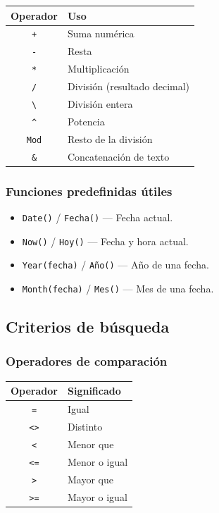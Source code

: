 \documentclass[12pt,a4paper]{article}
\begin{document}
\begin{center}
\begin{tabular}{c l}
\toprule
Operador & Uso \\
\midrule
\texttt{+} & Suma numérica \\
\texttt{-} & Resta \\
\texttt{*} & Multiplicación \\
\texttt{/} & División (resultado decimal) \\
\texttt{\textbackslash} & División entera \\
\texttt{\^{}} & Potencia \\
\texttt{Mod} & Resto de la división \\
\texttt{\&} & Concatenación de texto \\
\bottomrule
\end{tabular}
\end{center}

\subsubsection{Funciones predefinidas útiles}

\begin{itemize}
  \item \texttt{Date()} / \texttt{Fecha()} --- Fecha actual.
  \item \texttt{Now()} / \texttt{Hoy()} --- Fecha y hora actual.
  \item \texttt{Year(fecha)} / \texttt{Año()} --- Año de una fecha.
  \item \texttt{Month(fecha)} / \texttt{Mes()} --- Mes de una fecha.
\end{itemize}

\subsection{Criterios de búsqueda}

\subsubsection{Operadores de comparación}

\begin{center}
\begin{tabular}{c l}
\toprule
Operador & Significado \\
\midrule
\texttt{=} & Igual \\
\texttt{<>} & Distinto \\
\texttt{<} & Menor que \\
\texttt{<=} & Menor o igual \\
\texttt{>} & Mayor que \\
\texttt{>=} & Mayor o igual \\
\bottomrule
\end{tabular}
\end{center}
\end{document}
